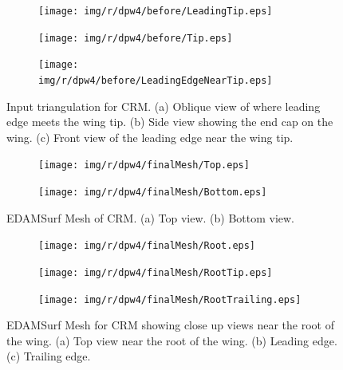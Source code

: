\begin{figure}[!hbt]
	\centering
	\begin{subfigure}{\textwidth}
		\centering
		\texttt{[image: img/r/dpw4/before/LeadingTip.eps]}
		\caption{}
		\label{dBeforeLeadingTip}
	\end{subfigure}
	\begin{subfigure}{\textwidth}
		\centering
		\texttt{[image: img/r/dpw4/before/Tip.eps]}
		\caption{}
		\label{dBeforeTip}
	\end{subfigure}
	\begin{subfigure}{\textwidth}
		\centering
		\texttt{[image: img/r/dpw4/before/LeadingEdgeNearTip.eps]}
		\caption{}
		\label{dBeforeLeading}
	\end{subfigure}
	\caption[Close up views of CRM's input triangulation.]{Input triangulation for CRM. (a) Oblique view of where leading edge meets the wing tip. (b) Side view showing the end cap on the wing. (c) Front view of the leading edge near the wing tip.}
	\label{fig-beforeTip}
\end{figure}

\begin{figure}[!hbt]
	\centering
	\begin{subfigure}{\textwidth}
		\centering
		\texttt{[image: img/r/dpw4/finalMesh/Top.eps]}
		\caption{}
		\label{dTop}
	\end{subfigure}
	\begin{subfigure}{\textwidth}
		\centering
		\texttt{[image: img/r/dpw4/finalMesh/Bottom.eps]}
		\caption{}
		\label{dBottom}
	\end{subfigure}
	\caption[Top and bottom view of EDAMSurf Mesh of CRM.]{EDAMSurf Mesh of CRM. (a) Top view. (b) Bottom view.}
	\label{fig-dpw4TopAndBottom}
\end{figure}

\begin{figure}
	\centering
	\begin{subfigure}{\textwidth}
		\centering
		\texttt{[image: img/r/dpw4/finalMesh/Root.eps]}
		\caption{}
		\label{dRoot}
	\end{subfigure}
	\begin{subfigure}{\textwidth}
		\centering
		\texttt{[image: img/r/dpw4/finalMesh/RootTip.eps]}
		\caption{}
		\label{dLeadingRoot}
	\end{subfigure}    
	\begin{subfigure}{\textwidth}
		\centering
		\texttt{[image: img/r/dpw4/finalMesh/RootTrailing.eps]}
		\caption{}
		\label{dRootTrailing}
	\end{subfigure}
	\caption[Close up views near wing root of EDAMSurf mesh of CRM.]{EDAMSurf Mesh for CRM showing close up views near the root of the wing. (a) Top view near the root of the wing. (b) Leading edge. (c) Trailing edge.}
	\label{fig-dpw4Root}
\end{figure}

